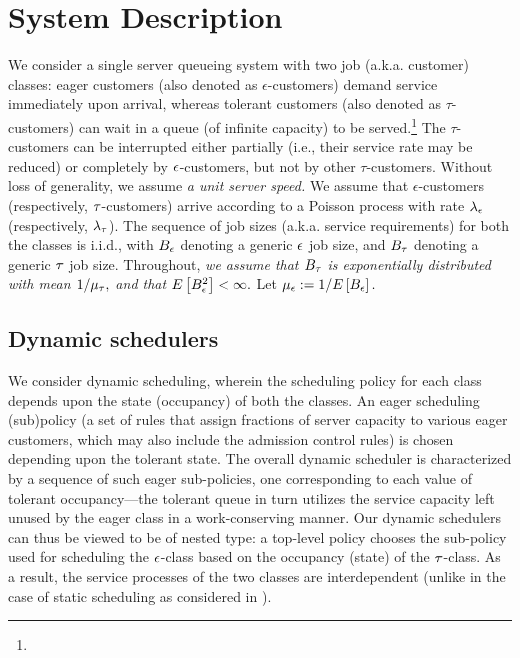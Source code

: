 \section{System Description}
\label{sec:model}

We consider a single server queueing system with two job (a.k.a.
customer) classes: eager customers (also denoted as
$\epsilon$-customers) demand service immediately upon arrival, whereas
tolerant customers (also denoted as $\tau$-customers) can wait in a
queue (of infinite capacity) to be served.\footnote{} The
$\tau$-customers can be interrupted either partially (i.e., their
service rate may be reduced) or completely by ${ \epsilon }$-customers, but not
by other $\tau$-customers.  Without loss of generality, we assume {\it
  a unit server speed.}
%
We assume that $\epsilon$-customers (respectively, ${\tau}$-customers)
arrive according to a Poisson process with rate $\lambda_{{ \epsilon }}$
(respectively, $\lambda_{\tau}$). The sequence of job sizes
(a.k.a. service requirements) for both the classes is i.i.d., with
$B_{ \epsilon }$ denoting a generic ${ \epsilon }$ job size, and $B_{\tau}$ denoting a generic
${\tau}$ job size. Throughout, {\it we assume that $B_{\tau}$ is exponentially
  distributed with mean $1/\mu_{\tau},$ and that $E\left[B_{ \epsilon }^2\right] < \infty.$}
Let $\mu_{ \epsilon } := 1/E\left[B_{ \epsilon }\right].$

\subsection{Dynamic schedulers}

We consider dynamic scheduling, wherein the scheduling policy for each
class depends upon the state (occupancy) of both the classes.  An
eager scheduling (sub)policy (a set of rules that assign fractions of
server capacity to various eager customers, which may also include the
admission control rules) is chosen depending upon the tolerant
state. The overall dynamic scheduler is characterized by a sequence of
such eager sub-policies, one corresponding to each value of tolerant
occupancy---the tolerant queue in turn utilizes the service capacity
left unused by the eager class in a work-conserving manner. Our
dynamic schedulers can thus be viewed to be of nested type: a
top-level policy chooses the sub-policy used for scheduling the
${ \epsilon }$-class based on the occupancy (state) of the
${\tau}$-class. 
As a result, the service processes of the two classes are
interdependent (unlike in the case of static scheduling as considered
in \cite{ANOR,Value}).

